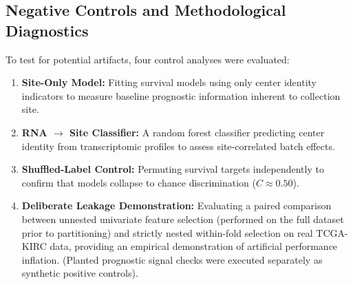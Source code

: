 \documentclass{article}
\begin{document}
\subsection{Negative Controls and Methodological Diagnostics}
To test for potential artifacts, four control analyses were evaluated:
\begin{enumerate}
    \item \textbf{Site-Only Model:} Fitting survival models using only center identity indicators to measure baseline prognostic information inherent to collection site.
    \item \textbf{RNA $\to$ Site Classifier:} A random forest classifier predicting center identity from transcriptomic profiles to assess site-correlated batch effects.
    \item \textbf{Shuffled-Label Control:} Permuting survival targets independently to confirm that models collapse to chance discrimination ($C \approx 0.50$).
    \item \textbf{Deliberate Leakage Demonstration:} Evaluating a paired comparison between unnested univariate feature selection (performed on the full dataset prior to partitioning) and strictly nested within-fold selection on real TCGA-KIRC data, providing an empirical demonstration of artificial performance inflation. (Planted prognostic signal checks were executed separately as synthetic positive controls).
\end{enumerate}
\end{document}
